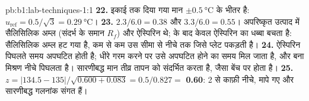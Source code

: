 \begin{solution}{pb:b1:lab-techniques-1:1}
\textbf{22.} इकाई तक दिया गया मान $\pm\qty{0.5}{\celsius}$ के भीतर है:
$u_{\mathrm{ref}} = 0.5/\sqrt3 = \qty{0.29}{\celsius}$।
\textbf{23.} $2.3/6.0 = 0.38$ और $3.3/6.0 = 0.55$। अपरिष्कृत उत्पाद में
सैलिसिलिक अम्ल (संदर्भ के समान $R_f$) और ऐस्पिरिन थे;  के बाद
केवल ऐस्पिरिन का धब्बा बचता है: सैलिसिलिक अम्ल
हट गया है, कम से कम उस सीमा से नीचे तक जिसे प्लेट पकड़ती है।
\textbf{24.} ऐस्पिरिन पिघलते समय अपघटित होती है; धीरे गरम करने पर उसे
अपघटित होने का समय मिल जाता है, और बना मिश्रण नीचे पिघलता है। सारणीबद्ध मान
तीव्र तापन को संदर्भित करता है, जैसा बेंच पर होता है।
\textbf{25.} $z = |134.5 - 135|/\sqrt{0.600 + 0.083} = 0.5/0.827 =$
\textbf{0.60}: 2 से काफ़ी नीचे, मापे गए और सारणीबद्ध गलनांक
संगत हैं।
\end{solution}

